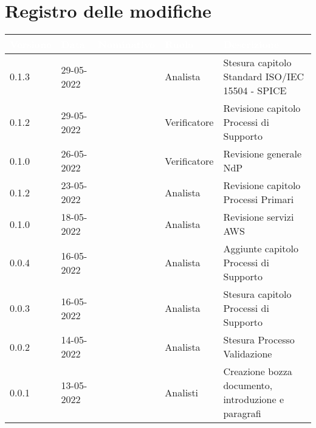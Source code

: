 \section*{Registro delle modifiche}
{

\newlength{\freewidth}
\setlength{\freewidth}{\dimexpr\textwidth-10\tabcolsep}
\renewcommand{\arraystretch}{1.5}
\centering
\setlength{\aboverulesep}{0pt}
\setlength{\belowrulesep}{0pt}
\begin{longtable}{C{.13\freewidth} C{.15\freewidth} C{.26\freewidth} C{.18\freewidth} C{.282379\freewidth}}
	\toprule
{}
\textcolor{white}{\textbf{Versione}}&
\textcolor{white}{\textbf{Data}}&
\textcolor{white}{\textbf{Nominativo}}&
\textcolor{white}{\textbf{Ruolo}}&
\textcolor{white}{\textbf{Descrizione}}\\	
\toprule
\endhead

0.1.3 & 29-05-2022 & \matteo{} & Analista & Stesura capitolo Standard ISO/IEC 15504 - SPICE\\
0.1.2 & 29-05-2022 & \matteo{} & Verificatore & Revisione capitolo Processi di Supporto\\
0.1.0 & 26-05-2022 & \marcov{} & Verificatore & Revisione generale NdP\\
0.1.2 & 23-05-2022 & \matteo{} & Analista & Revisione capitolo Processi Primari\\
0.1.0 & 18-05-2022 & \marcov{} & Analista & Revisione servizi AWS\\
0.0.4 & 16-05-2022 & \matteo{} & Analista & Aggiunte capitolo Processi di Supporto\\
0.0.3 & 16-05-2022 & \marcov{} & Analista & Stesura capitolo Processi di Supporto\\		
0.0.2 & 14-05-2022 & \matteo{} & Analista & Stesura Processo Validazione\\
0.0.1 & 13-05-2022 & \teamname{} & Analisti & Creazione bozza documento, introduzione e paragrafi\\	
\bottomrule
\end{longtable}
}
